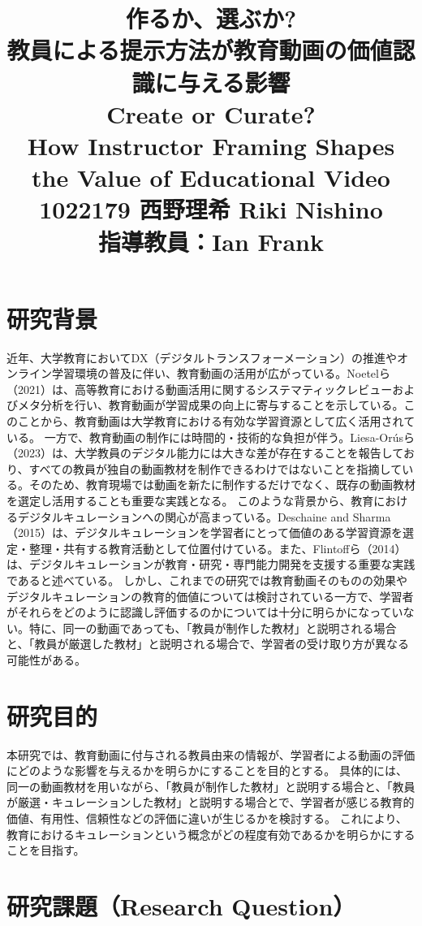 \documentclass[a4paper,10pt]{ltjsarticle}
\title{作るか、選ぶか?\\教員による提示方法が教育動画の価値認識に与える影響\\
\large Create or Curate?\\ How Instructor Framing Shapes the Value of Educational Video\\
1022179 西野理希 Riki Nishino\\
指導教員：Ian Frank}
\author{}
\date{}
\begin{document}
\maketitle

\section{研究背景}

近年、大学教育においてDX（デジタルトランスフォーメーション）の推進やオンライン学習環境の普及に伴い、教育動画の活用が広がっている。Noetelら（2021）は、高等教育における動画活用に関するシステマティックレビューおよびメタ分析を行い、教育動画が学習成果の向上に寄与することを示している。このことから、教育動画は大学教育における有効な学習資源として広く活用されている。
一方で、教育動画の制作には時間的・技術的な負担が伴う。Liesa-Orúsら（2023）は、大学教員のデジタル能力には大きな差が存在することを報告しており、すべての教員が独自の動画教材を制作できるわけではないことを指摘している。そのため、教育現場では動画を新たに制作するだけでなく、既存の動画教材を選定し活用することも重要な実践となる。
このような背景から、教育におけるデジタルキュレーションへの関心が高まっている。Deschaine and Sharma（2015）は、デジタルキュレーションを学習者にとって価値のある学習資源を選定・整理・共有する教育活動として位置付けている。また、Flintoffら（2014）は、デジタルキュレーションが教育・研究・専門能力開発を支援する重要な実践であると述べている。
しかし、これまでの研究では教育動画そのものの効果やデジタルキュレーションの教育的価値については検討されている一方で、学習者がそれらをどのように認識し評価するのかについては十分に明らかになっていない。特に、同一の動画であっても、「教員が制作した教材」と説明される場合と、「教員が厳選した教材」と説明される場合で、学習者の受け取り方が異なる可能性がある。

\section{研究目的}

本研究では、教育動画に付与される教員由来の情報が、学習者による動画の評価にどのような影響を与えるかを明らかにすることを目的とする。
具体的には、同一の動画教材を用いながら、「教員が制作した教材」と説明する場合と、「教員が厳選・キュレーションした教材」と説明する場合とで、学習者が感じる教育的価値、有用性、信頼性などの評価に違いが生じるかを検討する。
これにより、教育におけるキュレーションという概念がどの程度有効であるかを明らかにすることを目指す。

\section{研究課題（Research Question）}
\end{document}
